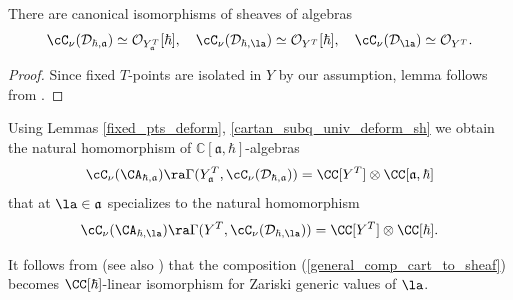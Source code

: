 \documentclass[12pt]{amsart}
\newcommand{\CO}{\mathcal{O}}
\begin{document}
\begin{lemma}\label{cartan_subq_univ_deform_sh}
There are canonical isomorphisms of sheaves of algebras 
\begin{equation*}
\cC_\nu(\mathcal{D}_{\hbar,\mathfrak{a}}) \simeq \CO_{Y_{\mathfrak{a}}^{T}}[\hbar], \quad \cC_\nu(\mathcal{D}_{\hbar,\la}) \simeq \CO_{Y^{T}}[\hbar], \quad \cC_\nu(\mathcal{D}_\la) \simeq \CO_{Y^{T}}.
\end{equation*}
\end{lemma}
\begin{proof}
Since fixed $T$-points are isolated in $Y$ by our assumption, lemma follows from \cite[Lemma 5.2]{BPWII}.
\end{proof}


Using Lemmas \ref{fixed_pts_deform}, \ref{cartan_subq_univ_deform_sh} we obtain the natural homomorphism of $\mathbb{C}[\mathfrak{a},\hbar]$-algebras
\begin{equation*}
\cC_\nu(\CA_{\hbar,\mathfrak{a}}) \ra \Gamma(Y_{\mathfrak{a}}^{T},\cC_\nu(\mathcal{D}_{\hbar,\mathfrak{a}}))=\CC[Y^T] \otimes \CC[\mathfrak{a},\hbar]
\end{equation*}
that at $\la \in \mathfrak{a}$ specializes to the  natural homomorphism
\begin{equation}\label{general_comp_cart_to_sheaf}
\cC_\nu(\CA_{\hbar,\la}) \ra \Gamma(Y^T,\cC_\nu(\mathcal{D}_{\hbar,\la}))=\CC[Y^T] \otimes \CC[\hbar].
\end{equation}

\begin{rmk}\label{iso_cart_generic}
It follows from \cite[Proposition 5.3]{BPW} (see also \cite[Proposition 5.3]{LosevCatO}) that the composition (\ref{general_comp_cart_to_sheaf}) becomes $\CC[\hbar]$-linear isomorphism for Zariski generic values of $\la$. 
\end{rmk}
\end{document}
